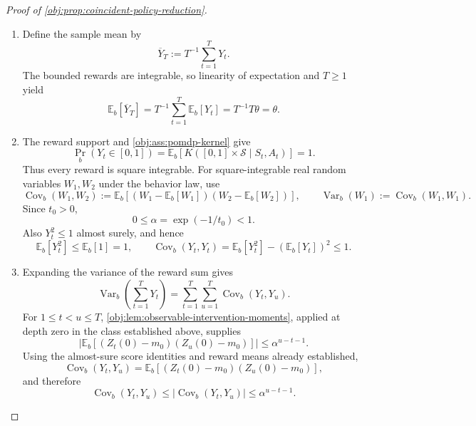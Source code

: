 \documentclass[11pt]{article}
\begin{document}
\begin{proof}[Proof of \cref{obj:prop:coincident-policy-reduction}]
\begin{enumerate}
\item Define the sample mean by
\[
\overline Y_T:=T^{-1}\sum_{t=1}^{T}Y_t.
\]
The bounded rewards are integrable, so linearity of expectation and \(T\geq1\) yield
\[
\mathbb E_b[\overline Y_T]
=
T^{-1}\sum_{t=1}^{T}\mathbb E_b[Y_t]
=
T^{-1}T\theta
=
\theta.
\]

\item The reward support and \cref{obj:ass:pomdp-kernel} give
\[
\Pr_b(Y_t\in[0,1])
=
\mathbb E_b\!\left[
K([0,1]\times\mathcal S\mid S_t,A_t)
\right]
=1.
\]
Thus every reward is square integrable. For square-integrable real random variables \(W_1,W_2\) under the behavior law, use
\[
\operatorname{Cov}_b(W_1,W_2)
:=
\mathbb E_b\!\left[
(W_1-\mathbb E_b[W_1])(W_2-\mathbb E_b[W_2])
\right],
\qquad
\operatorname{Var}_b(W_1)
:=
\operatorname{Cov}_b(W_1,W_1).
\]
Since \(t_0>0\),
\[
0\leq\alpha=\exp(-1/t_0)<1.
\]
Also \(Y_t^2\leq1\) almost surely, and hence
\[
\mathbb E_b[Y_t^2]\leq\mathbb E_b[1]=1,
\qquad
\operatorname{Cov}_b(Y_t,Y_t)
=
\mathbb E_b[Y_t^2]-(\mathbb E_b[Y_t])^2
\leq1.
\]

\item Expanding the variance of the reward sum gives
\[
\operatorname{Var}_b\!\left(\sum_{t=1}^{T}Y_t\right)
=
\sum_{t=1}^{T}\sum_{u=1}^{T}
\operatorname{Cov}_b(Y_t,Y_u).
\]
For \(1\leq t<u\leq T\), \cref{obj:lem:observable-intervention-moments}, applied at depth zero in the class established above, supplies
\[
\left|
\mathbb E_b\!\left[
(Z_t(0)-m_0)(Z_u(0)-m_0)
\right]
\right|
\leq\alpha^{u-t-1}.
\]
Using the almost-sure score identities and reward means already established,
\[
\operatorname{Cov}_b(Y_t,Y_u)
=
\mathbb E_b\!\left[
(Z_t(0)-m_0)(Z_u(0)-m_0)
\right],
\]
and therefore
\[
\operatorname{Cov}_b(Y_t,Y_u)
\leq
\left|\operatorname{Cov}_b(Y_t,Y_u)\right|
\leq\alpha^{u-t-1}.
\]


\end{enumerate}
\end{proof}
\end{document}
